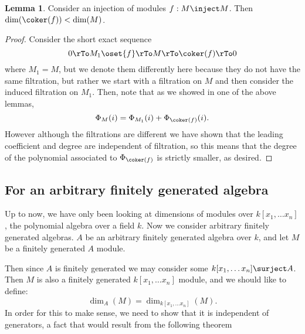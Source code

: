 \documentclass[12 pt]{article}
\theoremstyle{definition}
\newtheorem{lemma}[thm]{Lemma}
\renewcommand{\(}{\left(}
\renewcommand{\)}{\right)}
\begin{document}
\begin{lemma} Consider an injection of modules $f:M \inject M$. Then $\dim(\coker(f))<\dim(M)$.
\label{dimmodf}
\end{lemma}
\begin{proof} Consider the short exact sequence
\[0 \rTo M_1 \oset{f}\rTo M \rTo \coker(f) \rTo 0\]
where $M_1=M$, but we denote them differently here because they do not have the same filtration, but rather we start with a filtration on $M$ and then consider the induced filtration on $M_1$. Then, note that as we showed in one of the above lemmas,
\[\Phi_M(i)=\Phi_{M_1}(i)+\Phi_{\coker(f)}(i).\]
However although the filtrations are different we have shown that the leading coefficient and degree are independent of filtration, so this means that the degree of the polynomial associated to $\Phi_{\coker(f)}$ is strictly smaller, as desired.
\end{proof}



\subsection{For an arbitrary finitely generated algebra}

Up to now, we have only been looking at dimensions of modules over $k[x_1, \ldots x_n]$, the polynomial algebra over a field $k$. Now we consider arbitrary finitely generated algebras. $A$ be an arbitrary finitely generated algebra over $k$, and let $M$ be a finitely generated $A$ module.

Then since $A$ is finitely generated we may consider some $k[x_1, \ldots x_n] \surject A$. Then $M$ is also a finitely generated $k[x_1, \ldots x_n]$ module, and we should like to define:
\[\dim_A(M)=\dim_{k[x_1, \ldots x_n]}(M).\]
In order for this to make sense, we need to show that it is independent of generators, a fact that would result from the following theorem
\end{document}
